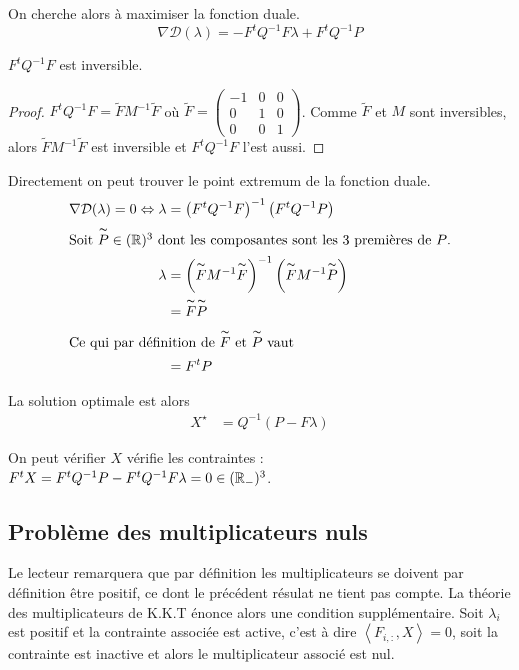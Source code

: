On cherche alors à maximiser la fonction duale.
\begin{equation}
\nabla \mathcal D (\lambda) = -F^tQ^{-1}F\lambda + F^tQ^{-1}P
\end{equation}

\begin{prop}[Inversibilité de $F^tQ^{-1}F$]
  $F^tQ^{-1}F$ est inversible.
\end{prop}
\begin{proof}
$F^tQ^{-1}F = \tilde FM^{-1}\tilde F$ où $\tilde F = \begin{pmatrix}
-1 & 0 & 0 \\
0 & 1 & 0 \\
0 & 0 & 1
\end{pmatrix}$.  Comme $\tilde F$ et $M$ sont inversibles, alors $\tilde FM^{-1}\tilde F$ est inversible et $F^tQ^{-1}F$ l'est aussi.
\end{proof}

Directement on peut trouver le point extremum de la fonction duale.
\begin{align}
\nabla \mathcal D (\lambda) = 0 \Leftrightarrow \lambda &= \left(F^tQ^{-1}F\right)^{-1}\left(F^tQ^{-1}P\right)\\
\intertext{Soit $\overset{\thicksim}{P}\in (\mathbb R)^3$ dont les composantes sont les 3 premières de $P$.}
\lambda &  = \left(\overset{\thicksim}{F}M^{-1}\overset{\thicksim}{F}\right)^{-1}\left(\overset{\thicksim}{F}M^{-1}\overset{\thicksim}{P}\right) \\
& = \overset{\thicksim}{F}\overset{\thicksim}{P}\\
\intertext{Ce qui par définition de $\overset{\thicksim}{F}$ et $\overset{\thicksim}{P}$ vaut}
& = F^tP
\end{align}

La solution optimale est alors
\begin{align}
X^\star &= Q^{-1}\left(P- F\lambda\right)
\end{align}

On peut vérifier $X$ vérifie les contraintes : $ F^t X = F^t Q^{-1} P - F^tQ^{-1}F\lambda = 0 \in (\mathbb R_-)^3$.

\subsection{Problème des multiplicateurs nuls}


Le lecteur remarquera que par définition les multiplicateurs se doivent par définition être positif, ce dont le précédent résulat ne tient pas compte. La théorie des multiplicateurs de K.K.T énonce alors une condition supplémentaire. Soit $\lambda_i$ est positif et la contrainte associée est active, c'est à dire $\left<F_{i,:},X\right> = 0$, soit la contrainte est inactive et alors le multiplicateur associé est nul.

